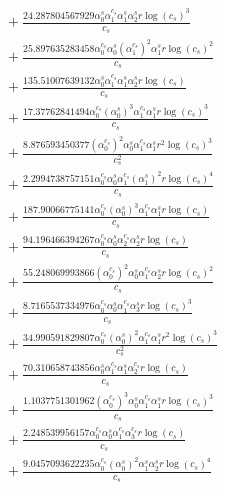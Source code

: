 \documentclass[10pt]{article}
\begin{document}
\begin{align*}
&{}  + \frac{24.287804567929 \alpha_{0}^s \alpha_{1}^{c_s} \alpha_{1}^s \alpha_{2}^s r \log{\left(c_{s} \right)}^{3}}{c_{s}} \\
&{}  + \frac{25.897635283458 \alpha_{0}^{c_s} \alpha_{0}^s \left(\alpha_{1}^{c_s}\right)^{2} \alpha_{1}^s r \log{\left(c_{s} \right)}^{2}}{c_{s}} \\
&{}  + \frac{135.51007639132 \alpha_{0}^s \alpha_{1}^{c_s} \alpha_{1}^s \alpha_{2}^s r \log{\left(c_{s} \right)}}{c_{s}} \\
&{}  + \frac{17.37762841494 \alpha_{0}^{c_s} \left(\alpha_{0}^s\right)^{3} \alpha_{1}^{c_s} \alpha_{1}^s r \log{\left(c_{s} \right)}^{3}}{c_{s}} \\
&{}  + \frac{8.876593450377 \left(\alpha_{0}^{c_s}\right)^{2} \alpha_{0}^s \alpha_{1}^{c_s} \alpha_{1}^s r^{2} \log{\left(c_{s} \right)}^{3}}{c_{s}^{2}} \\
&{}  + \frac{2.2994738757151 \alpha_{0}^{c_s} \alpha_{0}^s \alpha_{1}^{c_s} \left(\alpha_{1}^s\right)^{2} r \log{\left(c_{s} \right)}^{4}}{c_{s}} \\
&{}  + \frac{187.90066775141 \alpha_{0}^{c_s} \left(\alpha_{0}^s\right)^{3} \alpha_{1}^{c_s} \alpha_{1}^s r \log{\left(c_{s} \right)}}{c_{s}} \\
&{}  + \frac{94.196466394267 \alpha_{0}^{c_s} \alpha_{0}^s \alpha_{2}^{c_s} \alpha_{2}^s r \log{\left(c_{s} \right)}}{c_{s}} \\
&{}  + \frac{55.248069993866 \left(\alpha_{0}^{c_s}\right)^{2} \alpha_{0}^s \alpha_{1}^{c_s} \alpha_{2}^s r \log{\left(c_{s} \right)}^{2}}{c_{s}} \\
&{}  + \frac{8.7165537334976 \alpha_{0}^{c_s} \alpha_{0}^s \alpha_{1}^{c_s} \alpha_{3}^s r \log{\left(c_{s} \right)}^{3}}{c_{s}} \\
&{}  + \frac{34.990591829807 \alpha_{0}^{c_s} \left(\alpha_{0}^s\right)^{2} \alpha_{1}^{c_s} \alpha_{1}^s r^{2} \log{\left(c_{s} \right)}^{3}}{c_{s}^{2}} \\
&{}  + \frac{70.310658743856 \alpha_{0}^s \alpha_{1}^{c_s} \alpha_{1}^s \alpha_{2}^{c_s} r \log{\left(c_{s} \right)}}{c_{s}} \\
&{}  + \frac{1.1037751301962 \left(\alpha_{0}^{c_s}\right)^{3} \alpha_{0}^s \alpha_{1}^{c_s} \alpha_{1}^s r \log{\left(c_{s} \right)}^{3}}{c_{s}} \\
&{}  + \frac{2.248539956157 \alpha_{0}^{c_s} \alpha_{0}^s \alpha_{1}^{c_s} \alpha_{3}^{c_s} r \log{\left(c_{s} \right)}}{c_{s}} \\
&{}  + \frac{9.0457093622235 \alpha_{0}^{c_s} \left(\alpha_{0}^s\right)^{2} \alpha_{1}^s \alpha_{2}^s r \log{\left(c_{s} \right)}^{4}}{c_{s}} \\

\end{align*}
\end{document}
